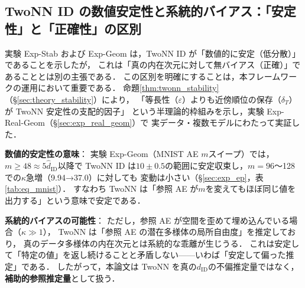 \documentclass[11pt,a4paper]{jsarticle}
\begin{document}
\subsection{TwoNN ID の数値安定性と系統的バイアス：「安定性」と「正確性」の区別}\label{sec:disc_twonn_bias}

実験 Exp-Stab および Exp-Geom は，TwoNN ID が「数値的に安定（低分散）」であることを示したが，
これは「真の内在次元に対して無バイアス（正確）」であることとは別の主張である．
この区別を明確にすることは，本フレームワークの運用において重要である．
命題\ref{thm:twonn_stability}（§\ref{sec:theory_stability}）により，
「等長性（$\varepsilon$）よりも近傍順位の保存（$\delta_T$）が TwoNN 安定性の支配的因子」
という半理論的枠組みを示し，実験 Exp-Real-Geom（§\ref{sec:exp_real_geom}）で
実データ・複数モデルにわたって実証した．

\textbf{数値的安定性の意味}：
実験 Exp-Geom（MNIST AE $m$スイープ）では，$m \geq 48 \approx 5\hat{d}_\mathrm{ID}$以降で
TwoNN ID は$10 \pm 0.5$の範囲に安定収束し，$m = 96$〜128 での$\kappa$急増（9.94→37.0）に対しても
変動は小さい（§\ref{sec:exp_ep}，表\ref{tab:eq_mnist}）．
すなわち TwoNN は「参照 AE が$m$を変えてもほぼ同じ値を出力する」という意味で安定である．

\textbf{系統的バイアスの可能性}：
ただし，参照 AE が空間を歪めて埋め込んでいる場合（$\kappa \gg 1$），
TwoNN は「参照 AE の潜在多様体の局所自由度」を推定しており，
真のデータ多様体の内在次元とは系統的な乖離が生じうる．
これは安定して「特定の値」を返し続けることと矛盾しない——いわば「安定して偏った推定」である．
したがって，本論文は TwoNN を真の$d_\mathrm{ID}$の不偏推定量ではなく，
\textbf{補助的参照推定量}として扱う．
\end{document}

